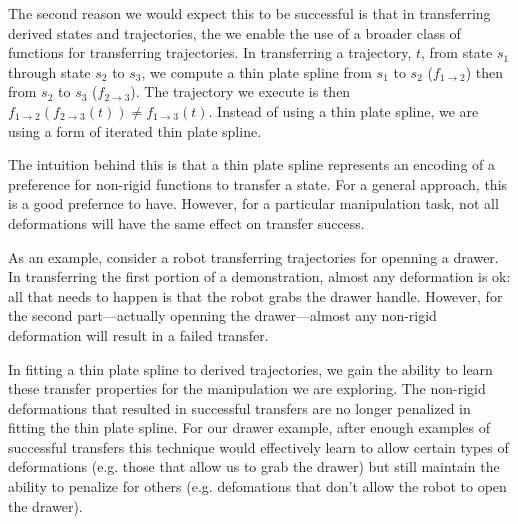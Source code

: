 The second reason we would expect this to be successful is that in transferring derived
states and trajectories, the we enable the use of a broader class of functions for 
transferring trajectories. In transferring a trajectory, $t$, from state $s_1$ through
state $s_2$ to $s_3$, we compute a thin plate spline from $s_1$ to $s_2$ 
($f_{1\rightarrow 2}$) then from $s_2$ to $s_3$ ($f_{2\rightarrow 3}$). The trajectory we
execute is then $f_{1\rightarrow 2}(f_{2\rightarrow 3}(t)) \ne f_{1\rightarrow 3}(t)$. 
Instead of using a thin plate spline, we are using a form of iterated thin plate spline.

The intuition behind this is that a thin plate spline represents an encoding of a preference
for non-rigid functions to transfer a state. For a general approach, this is a good
prefernce to have. However, for a particular manipulation task, not all deformations
will have the same effect on transfer success. 

As an example, consider a robot transferring
trajectories for openning a drawer. In transferring the first portion of a demonstration,
almost any deformation is ok: all that needs to happen is that the robot grabs the drawer handle.
However, for the second part---actually openning the drawer---almost any non-rigid deformation
will result in a failed transfer.

In fitting a thin plate spline to derived trajectories, we gain the ability 
to learn these transfer properties for the manipulation we are exploring.
The non-rigid deformations that resulted in successful transfers are no longer
penalized in fitting the thin plate spline. For our drawer example, after enough
examples of successful transfers this technique would effectively learn to allow
certain types of deformations (e.g. those that allow us to grab the drawer) but still
maintain the ability to penalize for others (e.g. defomations that don't allow the robot to
open the drawer).


